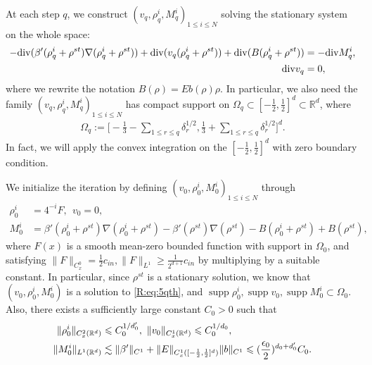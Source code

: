 \documentclass[UTF-8,reqno]{amsart}
\numberwithin{equation}{section}
\theoremstyle{definition}
\DeclareMathOperator{\supp}{supp}
\def\[{{\Big[}}
\def\]{{\Big]}}
\def\geq{\geqslant}
\def\leq{\leqslant}
\def\div{\mathord{{\rm div}}}
\def\[{{\Big[}}
\def\]{{\Big]}}
\def\geq{\geqslant}
\def\leq{\leqslant}
\def\div{\mathord{{\rm div}}}
\begin{document}
At each step $q$, we construct  
$
(v_q,\rho^i_q,M^i_q)_{1\leq i\leq N}
$
solving the stationary system on the whole space:
\begin{align}
-\div(\beta'(\rho_q^i+\rho^{st})\nabla(\rho_q^i+\rho^{st}))
+
\div(v_q(\rho_q^i+\rho^{st}))+\div(B(\rho_q^i+\rho^{st}))
&=
-\div M^i_q,
\notag\\
\div v_q&=0,
\label{R:eq:5qth}
\end{align}
where we rewrite the notation
$
B(\rho)=Eb(\rho)\rho.
$
In particular, we also need the family $
(v_q,\rho^i_q,M^i_q)_{1\leq i\leq N}
$ has compact support on $\Omega_q \subset [-\frac12,\frac12]^d\subset \mathbb{R}^d$, where 
\begin{align*}
     \Omega_q := \[-\frac13-\sum_{ 1\leq r\leq q} {\delta}_r^{1/2},\frac13+\sum_{ 1\leq r\leq q} {\delta}_r^{1/2}\]^d.
\end{align*}
In fact, we will apply the convex integration on the $[-\frac12,\frac12]^d$ with zero boundary condition.

We initialize the iteration by defining
$
(v_0,\rho^i_0,M^i_0)_{1\leq i\leq N}
$
through
\begin{align*}
\rho^i_0 
&=
 4^{-i}F,
\ \
v_0 =0,
\\ 
M^i_0 
&=\beta'(\rho_0^i+\rho^{st})\nabla(\rho_0^i+\rho^{st})-\beta'(\rho^{st})\nabla(\rho^{st})
-B(\rho_0^i+\rho^{st})+B( \rho^{st}),
\end{align*}
where
$F(x)$ is a smooth mean-zero bounded   function with support in $\Omega_0$, and satisfying $\|F\|_{C_x^0}=\frac1 2 c_{in}, \|F\|_{L^1}\geq \frac1 {2^{d+1}} c_{in}$ by multiplying by a suitable constant. In particular, since $\rho^{st}$ is a stationary solution, we know that $(v_0,\rho^i_0,M^i_0)$ is a solution to \eqref{R:eq:5qth}, and $\supp\rho_0^i,\supp v_0,\supp M_0^i\subset\Omega_0$. 
Also, there exists a sufficiently large constant $C_0>0$ such that
\begin{align}
\|\rho^i_0\|_{C_x^2(\mathbb{R}^d)}
&\leq
C_0^{1/d_0'},\ \|v_0\|_{C_{x}^1(\mathbb{R}^d)}\leq C_0^{1/d_0},\notag\\ 
\|M^i_0\|_{L^1(\mathbb{R}^d)}
&\lesssim\|\beta' \|_{C^1 }+\|E \|_{C_{x}^1([-\frac12,\frac12]^d)}\|b\|_{C^1}\leq 
(\frac{\epsilon_0}{2})^{d_0+d_0'}C_0.
\label{R:bd:5rho_0,M_0}
\end{align}
 
\end{document}
